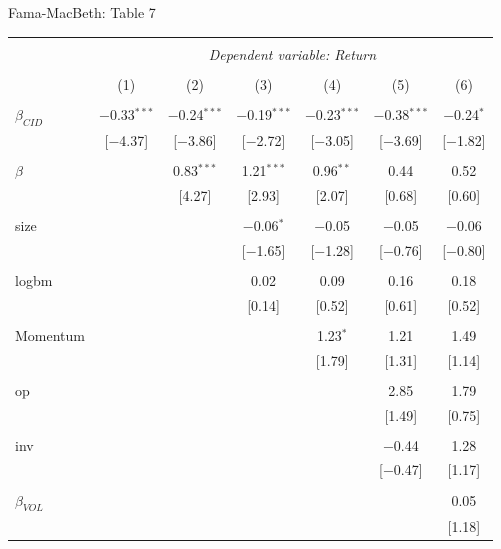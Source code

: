 \documentclass{beamer}
\begin{document}
{\renewcommand{\arraystretch}{0.58}
\begin{frame}{Fama-MacBeth: Table 7}
\vspace{-0.4cm}
\begin{table}[!htbp] \centering 
\begin{tabular}{@{\extracolsep{5pt}}lcccccc} 
\\[-1.8ex]\hline 
\hline \\[-1.0ex] 
 & \multicolumn{6}{c}{\textit{Dependent variable: Return}} \\ 
\cline{2-7} 
\\[-1.0ex] & (1) & (2) & (3) & (4) & (5) & (6)\\ 
\hline \\[-1.0ex] 
 $\beta_{CID}$ & $-$0.33$^{***}$ & $-$0.24$^{***}$ & $-$0.19$^{***}$ & $-$0.23$^{***}$ & $-$0.38$^{***}$ & $-$0.24$^{*}$ \\ 
  & [$-$4.37] & [$-$3.86] & [$-$2.72] & [$-$3.05] & [$-$3.69] & [$-$1.82] \\ 
  & & & & & & \\ 
 $\beta$ &  & 0.83$^{***}$ & 1.21$^{***}$ & 0.96$^{**}$ & 0.44 & 0.52 \\ 
  &  & [4.27] & [2.93] & [2.07] & [0.68] & [0.60] \\ 
  & & & & & & \\ 
 size &  &  & $-$0.06$^{*}$ & $-$0.05 & $-$0.05 & $-$0.06 \\ 
  &  &  & [$-$1.65] & [$-$1.28] & [$-$0.76] & [$-$0.80] \\ 
  & & & & & & \\ 
 logbm &  &  & 0.02 & 0.09 & 0.16 & 0.18 \\ 
  &  &  & [0.14] & [0.52] & [0.61] & [0.52] \\ 
  & & & & & & \\ 
 Momentum &  &  &  & 1.23$^{*}$ & 1.21 & 1.49 \\ 
  &  &  &  & [1.79] & [1.31] & [1.14] \\ 
  & & & & & & \\ 
 op &  &  &  &  & 2.85 & 1.79 \\ 
  &  &  &  &  & [1.49] & [0.75] \\ 
  & & & & & & \\ 
 inv &  &  &  &  & $-$0.44 & 1.28 \\ 
  &  &  &  &  & [$-$0.47] & [1.17] \\ 
  & & & & & & \\ 
 $\beta_{VOL}$ &  &  &  &  &  & 0.05 \\ 
  &  &  &  &  &  & [1.18] \\ 

\end{tabular}
\end{table}
\end{frame}}
\end{document}
